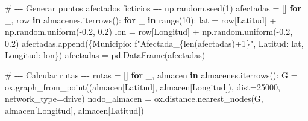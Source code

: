 \documentclass[
  spanish,
  us-letterpaper,
]{scrreprt}
\newenvironment{Shaded}{\begin{snugshade}}{\end{snugshade}}
\newcommand{\BuiltInTok}[1]{\textcolor[rgb]{0.00,0.23,0.31}{#1}}
\newcommand{\CommentTok}[1]{\textcolor[rgb]{0.37,0.37,0.37}{#1}}
\newcommand{\ControlFlowTok}[1]{\textcolor[rgb]{0.00,0.23,0.31}{\textbf{#1}}}
\newcommand{\DecValTok}[1]{\textcolor[rgb]{0.68,0.00,0.00}{#1}}
\newcommand{\FloatTok}[1]{\textcolor[rgb]{0.68,0.00,0.00}{#1}}
\newcommand{\KeywordTok}[1]{\textcolor[rgb]{0.00,0.23,0.31}{\textbf{#1}}}
\newcommand{\NormalTok}[1]{\textcolor[rgb]{0.00,0.23,0.31}{#1}}
\newcommand{\OperatorTok}[1]{\textcolor[rgb]{0.37,0.37,0.37}{#1}}
\newcommand{\SpecialCharTok}[1]{\textcolor[rgb]{0.37,0.37,0.37}{#1}}
\newcommand{\SpecialStringTok}[1]{\textcolor[rgb]{0.13,0.47,0.30}{#1}}
\newcommand{\StringTok}[1]{\textcolor[rgb]{0.13,0.47,0.30}{#1}}
\numberwithin{equation}{chapter} %
\begin{document}
\begin{Shaded}
\begin{Highlighting}[]
\CommentTok{\# {-}{-}{-} Generar puntos afectados ficticios {-}{-}{-}}
\NormalTok{np.random.seed(}\DecValTok{1}\NormalTok{)}
\NormalTok{afectadas }\OperatorTok{=}\NormalTok{ []}
\ControlFlowTok{for}\NormalTok{ \_, row }\KeywordTok{in}\NormalTok{ almacenes.iterrows():}
    \ControlFlowTok{for}\NormalTok{ \_ }\KeywordTok{in} \BuiltInTok{range}\NormalTok{(}\DecValTok{10}\NormalTok{):}
\NormalTok{        lat }\OperatorTok{=}\NormalTok{ row[}\StringTok{\textquotesingle{}Latitud\textquotesingle{}}\NormalTok{] }\OperatorTok{+}\NormalTok{ np.random.uniform(}\OperatorTok{{-}}\FloatTok{0.2}\NormalTok{, }\FloatTok{0.2}\NormalTok{)}
\NormalTok{        lon }\OperatorTok{=}\NormalTok{ row[}\StringTok{\textquotesingle{}Longitud\textquotesingle{}}\NormalTok{] }\OperatorTok{+}\NormalTok{ np.random.uniform(}\OperatorTok{{-}}\FloatTok{0.2}\NormalTok{, }\FloatTok{0.2}\NormalTok{)}
\NormalTok{        afectadas.append(\{}\StringTok{\textquotesingle{}Municipio\textquotesingle{}}\NormalTok{: }\SpecialStringTok{f"Afectada\_}\SpecialCharTok{\{}\BuiltInTok{len}\NormalTok{(afectadas)}\OperatorTok{+}\DecValTok{1}\SpecialCharTok{\}}\SpecialStringTok{"}\NormalTok{,}
         \StringTok{\textquotesingle{}Latitud\textquotesingle{}}\NormalTok{: lat, }\StringTok{\textquotesingle{}Longitud\textquotesingle{}}\NormalTok{: lon\})}
\NormalTok{afectadas }\OperatorTok{=}\NormalTok{ pd.DataFrame(afectadas)}

\CommentTok{\# {-}{-}{-} Calcular rutas {-}{-}{-}}
\NormalTok{rutas }\OperatorTok{=}\NormalTok{ []}
\ControlFlowTok{for}\NormalTok{ \_, almacen }\KeywordTok{in}\NormalTok{ almacenes.iterrows():}
\NormalTok{    G }\OperatorTok{=}\NormalTok{ ox.graph\_from\_point((almacen[}\StringTok{\textquotesingle{}Latitud\textquotesingle{}}\NormalTok{], almacen[}\StringTok{\textquotesingle{}Longitud\textquotesingle{}}\NormalTok{]),}
\NormalTok{     dist}\OperatorTok{=}\DecValTok{25000}\NormalTok{, network\_type}\OperatorTok{=}\StringTok{\textquotesingle{}drive\textquotesingle{}}\NormalTok{)}
\NormalTok{    nodo\_almacen }\OperatorTok{=}\NormalTok{ ox.distance.nearest\_nodes(G, almacen[}\StringTok{\textquotesingle{}Longitud\textquotesingle{}}\NormalTok{],}
\NormalTok{     almacen[}\StringTok{\textquotesingle{}Latitud\textquotesingle{}}\NormalTok{])}


\end{Highlighting}
\end{Shaded}
\end{document}
